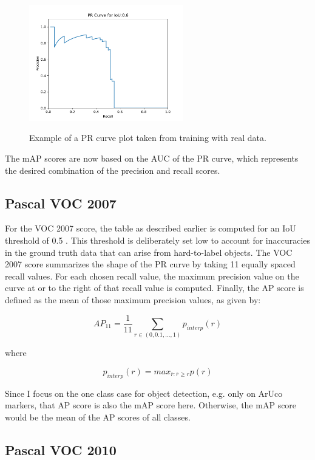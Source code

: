 \documentclass[10pt]{book}
\begin{document}
\begin{figure}
  \caption{Example of a \ac{PR curve} plot taken from training with real data.}
  \includegraphics[width=0.6\textwidth]{image/eval_PR_Curve_0.60}
  \label{fig:pr-curve}
\end{figure}

The \ac{mAP} scores are now based on the \ac{AUC} of the \ac{PR curve}, which represents the desired combination of the precision and recall scores.

\subsection{Pascal VOC 2007}

For the VOC 2007 score, the table as described earlier is computed for an \ac{IoU} threshold of 0.5 \cite{everingham2010pascal}. This threshold is deliberately set low to account for inaccuracies in the ground truth data that can arise from hard-to-label objects. The VOC 2007 score summarizes the shape of the \ac{PR curve} by taking 11 equally spaced recall values. For each chosen recall value, the maximum precision value on the curve at or to the right of that recall value is computed. Finally, the AP score is defined as the mean of those maximum precision values, as given by:

$$AP_{11} = \frac{1}{11} \sum_{r\in(0,0.1,...,1)}p_{interp}(r)$$

where

$$p_{interp}(r) = max_{\bar{r} : \bar{r} \geq r}p(r)$$


Since I focus on the one class case for object detection, e.g. only on ArUco markers, that AP score is also the \ac{mAP} score here. Otherwise, the \ac{mAP} score would be the mean of the AP scores of all classes.

\subsection{Pascal VOC 2010}
\end{document}
